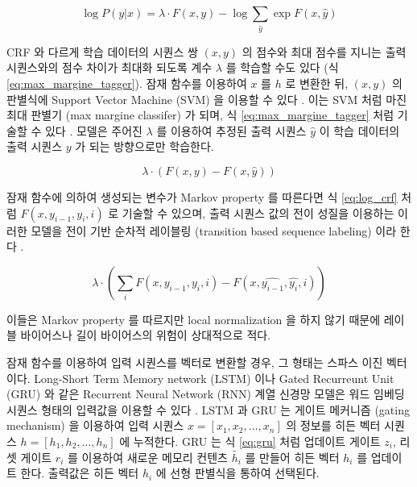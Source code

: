 \documentclass[oneside, ko,phd]{snuthesis_utf8_kor}
\begin{document}
\begin{equation}
  \label{eq:log_crf}
  \log P(y \vert x) = \lambda \cdot F(x, y) - \log \sum_{\hat{y}} \exp F(x, \hat{y})
\end{equation}

CRF 와 다르게 학습 데이터의 시퀀스 쌍 $(x, y)$ 의 점수와 최대 점수를 지니는 출력 시퀀스와의 점수 차이가 최대화 되도록 계수 $\lambda$ 를 학습할 수도 있다 (식 \ref{eq:max_margine_tagger}).
잠재 함수를 이용하여 $x$ 를 $h$ 로 변환한 뒤, $(x, y)$ 의 판별식에 Support Vector Machine (SVM) \cite{Cortes1995} 을 이용할 수 있다 \cite{tsochantaridis2005large}.
이는 SVM 처럼 마진 최대 판별기 (max margine classifer) 가 되며, 식 \ref{eq:max_margine_tagger} 처럼 기술할 수 있다 \cite{taskar2004max}.
모델은 주어진 $\lambda$ 를 이용하여 추정된 출력 시퀀스 $\hat{y}$ 이 학습 데이터의 출력 시퀀스 $y$ 가 되는 방향으로만 학습한다.

\begin{equation}
  \label{eq:max_margine_tagger}
  \lambda \cdot \left( F(x, y) - F(x, \hat{y}) \right)
\end{equation}

잠재 함수에 의하여 생성되는 변수가 Markov property 를 따른다면 식 \ref{eq:log_crf} 처럼 $F(x, y_{i-1}, y_{i}, i)$ 로 기술할 수 있으며, 출력 시퀀스 값의 전이 성질을 이용하는 이러한 모델을 전이 기반 순차적 레이블링 (transition based sequence labeling) 이라 한다 \cite{bohnet2012transition}.

\begin{equation}
  \label{eq:transition_based_tagger_i}
  \lambda \cdot \left( \sum_i F(x, y_{i-1}, y_i, i) - F(x, \hat{y_{i-1}}, \hat{y_i}, i) \right)
\end{equation}

이들은 Markov property 를 따르지만 local normalization 을 하지 않기 때문에 레이블 바이어스나 길이 바이어스의 위험이 상대적으로 적다.

잠재 함수를 이용하여 입력 시퀀스를 벡터로 변환할 경우, 그 형태는 스파스 이진 벡터이다.
Long-Short Term Memory network (LSTM) 이나 Gated Recurreunt Unit (GRU) 와 같은 Recurrent Neural Network (RNN) 계열 신경망 모델은 워드 임베딩 시퀀스 형태의 입력값을 이용할 수 있다 \cite{cho2014learning, hochreiter1997long}.
LSTM 과 GRU 는 게이트 메커니즘 (gating mechanism) 을 이용하여 입력 시퀀스 $x = [x_1, x_2, \dots, x_n]$ 의 정보를 히든 벡터 시퀀스 $h = [h_1, h_2, \dots, h_n]$ 에 누적한다.
GRU 는 식 \ref{eq:gru} 처럼 업데이트 게이트 $z_i$, 리셋 게이트 $r_i$ 를 이용하여 새로운 메모리 컨텐츠 $\tilde{h_i}$ 를 만들어 히든 벡터 $h_i$ 를 업데이트 한다.
출력값은 히든 벡터 $h_i$ 에 선형 판별식을 통하여 선택된다.
\end{document}
